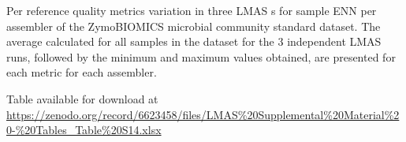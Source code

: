 \begin{table}[]
\centering
\caption{Per reference quality metrics variation in three LMAS s for sample ENN per assembler of the ZymoBIOMICS microbial community standard dataset. The average calculated for all samples in the dataset for the 3 independent LMAS runs, followed by the minimum and maximum values obtained, are presented for each metric for each assembler.}
\label{tab:ch5_suptable14}
Table available for download at \url{https://zenodo.org/record/6623458/files/LMAS\%20Supplemental\%20Material\%20-\%20Tables_Table\%20S14.xlsx}
\end{table}